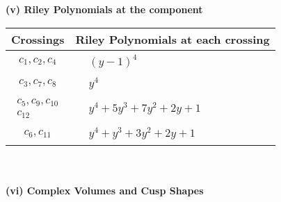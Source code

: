 \documentclass[1p]{elsarticle_modified}
\theoremstyle{definition}
\begin{document}
\newpage\renewcommand{\arraystretch}{1}
\flushleft \textbf{(v) Riley Polynomials at the component}\newline \\
\begin{tabular}{m{50pt}|m{274pt}}
Crossings & \hspace{64pt}Riley Polynomials at each crossing \\
\hline $$\begin{aligned}c_{1},c_{2},c_{4}\end{aligned}$$&$\begin{aligned}
&(y-1)^4
\end{aligned}$\\
\hline $$\begin{aligned}c_{3},c_{7},c_{8}\end{aligned}$$&$\begin{aligned}
&y^4
\end{aligned}$\\
\hline $$\begin{aligned}c_{5},c_{9},c_{10}\\c_{12}\end{aligned}$$&$\begin{aligned}
&y^4+5 y^3+7 y^2+2 y+1
\end{aligned}$\\
\hline $$\begin{aligned}c_{6},c_{11}\end{aligned}$$&$\begin{aligned}
&y^4+y^3+3 y^2+2 y+1
\end{aligned}$\\
\hline
\end{tabular}\\~\\
\newpage\flushleft \textbf{(vi) Complex Volumes and Cusp Shapes}
\end{document}
